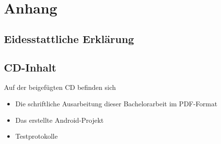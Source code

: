 \documentclass[a4paper,
oneside,
11pt, 
headsepline,
abstracton,
]{scrreprt} %
\begin{document}
\pagestyle{empty} %
% 
%
 

%
%
\renewcommand{\contentsname}{Inhalt} %
\tableofcontents 		

\cleardoublepage 	
\pagestyle{headings}	 	%
%






   
         



%
%

\printglossary[type=\acronymtype, title=Abkürzungen, style=super]
\printglossary[type=main,style=altlist]
% 
%
\clearpage
{}
\listoffigures
 \renewcommand\lstlistlistingname{Quellcodeverzeichnis} %
\lstlistoflistings%
 

\nocite{stvo}
\clearpage
\appendix
{}
\chapter*{Anhang}
\section*{Eidesstattliche Erklärung} 
\section*{CD-Inhalt}
Auf der beigefügten CD befinden sich
\begin{itemize}
	\item Die schriftliche Ausarbeitung dieser Bachelorarbeit im PDF-Format
	\item Das erstellte Android-Projekt
	\item Testprotokolle
\end{itemize}

 
\end{document}
